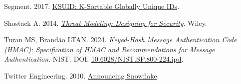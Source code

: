 \documentclass[fleqn,10pt,lineno]{wlpeerj}
\newlength{\cslhangindent}
\newenvironment{CSLReferences}[2]
 {\begin{list}{}{%
  \setlength{\itemindent}{0pt}
  \setlength{\leftmargin}{0pt}
  \setlength{\parsep}{0pt}
  \ifodd #1
   \setlength{\leftmargin}{\cslhangindent}
   \setlength{\itemindent}{-1\cslhangindent}
  \fi
  \setlength{\itemsep}{#2\baselineskip}}}
 {\end{list}}
\begin{document}
\begin{CSLReferences}{1}{0}
Segment. 2017. \href{https://github.com/segmentio/ksuid}{{KSUID:
K-Sortable Globally Unique IDs}}.

Shostack A. 2014.
\emph{\href{https://www.wiley.com/en-us/Threat+Modeling\%3A+Designing+for+Security-p-9781118809990}{{Threat
Modeling: Designing for Security}}}. Wiley.

Turan MS, Brandão LTAN. 2024. \emph{{Keyed-Hash Message Authentication
Code (HMAC): Specification of HMAC and Recommendations for Message
Authentication}}. NIST. DOI:
\href{https://doi.org/10.6028/NIST.SP.800-224.ipd}{10.6028/NIST.SP.800-224.ipd}.

Twitter Engineering. 2010.
\href{https://github.com/twitter-archive/snowflake}{{Announcing
Snowflake}}.

\end{CSLReferences}
\end{document}
